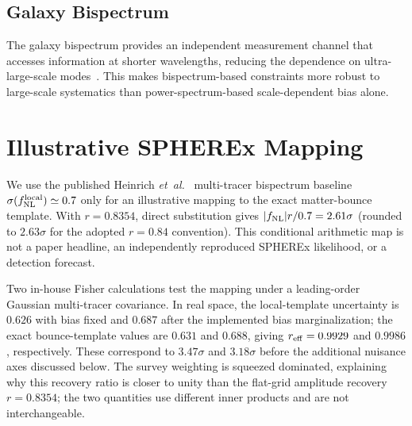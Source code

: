 \documentclass[aps,prd,twocolumn,superscriptaddress,showpacs,preprintnumbers,nofootinbib,longbibliography,floatfix]{revtex4-2}
\newcommand{\fnl}{f_{\rm NL}}
\newcommand{\etal}{\textit{et~al.}}
\begin{document}
\subsection{Galaxy Bispectrum}

The galaxy bispectrum provides an independent measurement channel that accesses information at shorter wavelengths, reducing the dependence on ultra-large-scale modes~\cite{Heinrich:2023}. This makes bispectrum-based constraints more robust to large-scale systematics than power-spectrum-based scale-dependent bias alone.

\section{Illustrative SPHEREx Mapping}
\label{sec:spherex}

We use the published Heinrich \etal~\cite{Heinrich:2023} multi-tracer bispectrum baseline $\sigma(\fnl^{\rm local})\simeq0.7$ only for an illustrative mapping to the exact matter-bounce template. With $r=0.8354$, direct substitution gives $|\fnl|r/0.7=2.61\sigma$ (rounded to $2.63\sigma$ for the adopted $r=0.84$ convention). This conditional arithmetic map is not a paper headline, an independently reproduced SPHEREx likelihood, or a detection forecast.

Two in-house Fisher calculations test the mapping under a leading-order Gaussian multi-tracer covariance. In real space, the local-template uncertainty is $0.626$ with bias fixed and $0.687$ after the implemented bias marginalization; the exact bounce-template values are $0.631$ and $0.688$, giving $r_{\rm eff}=0.9929$ and $0.9986$, respectively. These correspond to $3.47\sigma$ and $3.18\sigma$ before the additional nuisance axes discussed below. The survey weighting is squeezed dominated, explaining why this recovery ratio is closer to unity than the flat-grid amplitude recovery $r=0.8354$; the two quantities use different inner products and are not interchangeable.
\end{document}
